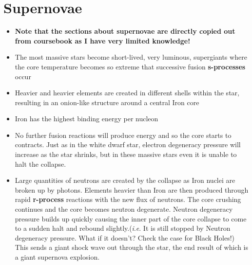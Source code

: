 \documentclass{article}
\newcommand{\ie}{\textit{i}.\textit{e}. }
\begin{document}
\section{Supernovae}
\begin{itemize}
\item \textbf{Note that the sections about supernovae are directly copied out from coursebook as I have very limited knowledge!}
\item The most massive stars become short-lived, very luminous, supergiants where the core temperature becomes so extreme that successive fusion \textbf{s-processes} occur
\item Heavier and heavier elements are created in different shells within the star, resulting in an onion-like structure around a central Iron core
\item Iron has the highest binding energy per nucleon
\item No further fusion reactions will produce energy and so the core starts to contracts. Just as in the white dwarf star, electron degeneracy pressure will increase as the star shrinks, but in these massive stars even it is unable to halt the collapse.
\item Large quantities of neutrons are created by the collapse as Iron nuclei are broken up by photons. Elements heavier than Iron are then produced through rapid \textbf{r-process} reactions with the new flux of neutrons. The core crushing continues and the core becomes neutron degenerate. Neutron degeneracy pressure builds up quickly causing the inner part of the core collapse to come to a sudden halt and rebound slightly.(\ie  It is still stopped by Neutron degeneracy pressure. What if it doesn't? Check the case for Black Holes!) This sends a giant shock wave out through the star, the end result of which is a giant supernova explosion.
\end{itemize}
\end{document}
